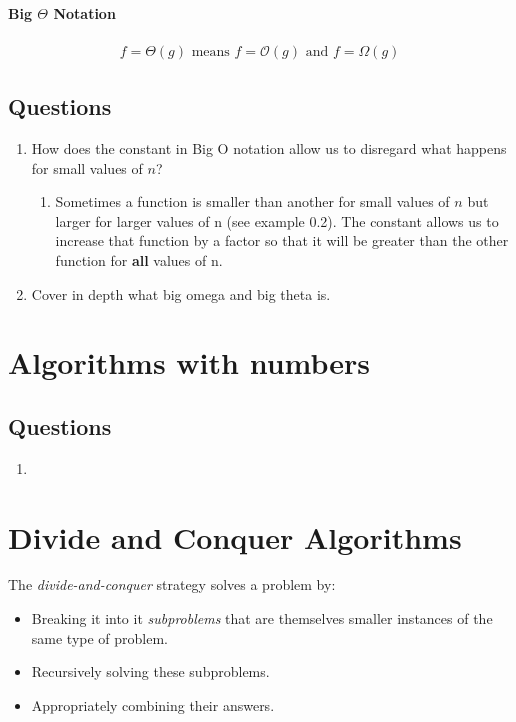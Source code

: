 \documentclass[12pt]{article}
\renewcommand{\O}{\mathcal{O}}
\begin{document}
\subsubsection{Big \texorpdfstring{$\Theta$}{Theta} Notation}
\begin{align*}
    f = \Theta(g) \text{ means } f = \O(g) \text{ and } f = \Omega(g)
\end{align*}


\section*{Questions}
\begin{enumerate}
    \item How does the constant in Big O notation allow us to disregard what happens for small values of $n$?
          \begin{enumerate}
              \item Sometimes a function is smaller than another for small values of $n$ but larger for larger values of n (see example 0.2). The constant allows us to increase that function by a factor so that it will be greater than the other function for \textbf{all} values of n.
          \end{enumerate}
    \item Cover in depth what big omega and big theta is.
\end{enumerate}

\chapter[06/15/23]{Algorithms with numbers}


\section*{Questions}
\begin{enumerate}
    \item
\end{enumerate}


\chapter[08/15/23]{Divide and Conquer Algorithms}
The \emph{divide-and-conquer} strategy solves a problem by:
\begin{itemize}
    \item Breaking it into it \emph{subproblems} that are themselves smaller instances of the same type of problem.
    \item Recursively solving these subproblems.
    \item Appropriately combining their answers.
\end{itemize}
\end{document}
